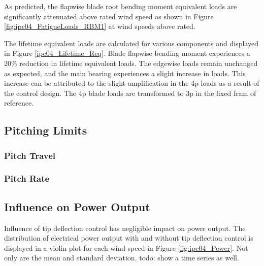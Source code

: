 As predicted, the flapwise blade root bending moment equivalent loads are significantly attenuated above rated wind speed as shown in Figure \ref{fig:ipc04_FatigueLoads_RBM1} at wind speeds above rated. 

The lifetime equivalent loads are calculated for various components and displayed in Figure \ref{ipc04_Lifetime_Req}. Blade flapwise bending moment experiences a 20\% reduction in lifetime equivalent loads. The edgewise loads remain unchanged as expected, and the main bearing experiences a slight increase in loads. This increase can be attributed to the slight amplification in the 4p loads as a result of the control design. The 4p blade loads are transformed to 3p in the fixed fram of reference.


\subsection{Pitching Limits}
\subsubsection{Pitch Travel}
\subsubsection{Pitch Rate}

\subsection{Influence on Power Output}
Influence of tip deflection control has negligible impact on power output. The distribution of electrical power output with and without tip deflection control is displayed in a violin plot for each wind speed in Figure \ref{fig:ipc04_Power}. Not only are the mean and standard deviation. todo: show a time series as well.
